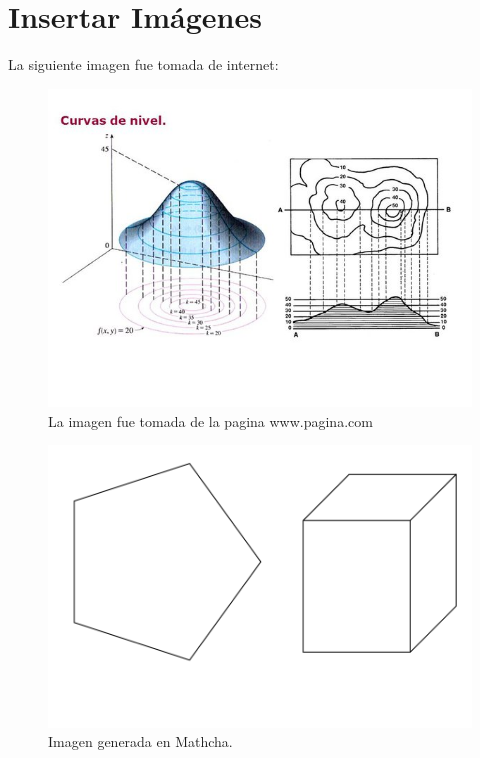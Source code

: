 \section{Insertar Imágenes}
\sangria La siguiente imagen fue tomada de internet:\\
\begin{figure}[H]
\begin{center}
\includegraphics[scale=0.4]{Imagenes/Imagen1}
\caption{La imagen fue tomada de la pagina www.pagina.com}
\end{center}
\end{figure}
\lipsum[1-15]
\begin{figure}[H]
\begin{center}
\includegraphics[scale=0.4]{Imagenes/Imagen2}
\caption{Imagen generada en Mathcha.}
\end{center}
\end{figure}
